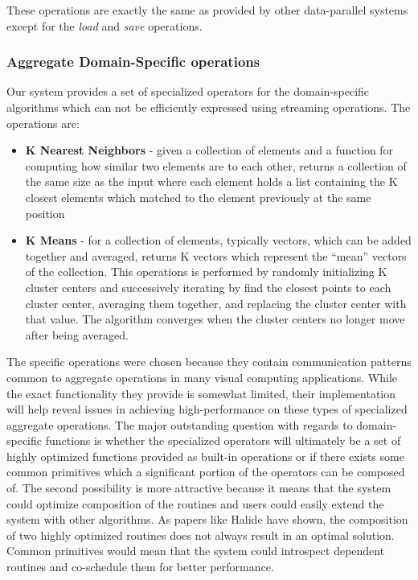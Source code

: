 \documentclass[tog]{acmsiggraph}
\begin{document}
These operations are exactly the same as provided by other data-parallel
systems except for the \textit{load} and \textit{save} operations.

\subsubsection{Aggregate Domain-Specific operations}
Our system provides a set of specialized operators for the domain-specific
algorithms which can not be efficiently expressed using streaming
operations. The operations are:

\begin{itemize}
\item \textbf{K Nearest Neighbors} - given a collection of elements and a
  function for computing how similar two elements are to each other, returns a
  collection of the same size as the input where each element holds a list
  containing the K closest elements which matched to the element previously at
  the same position
\item \textbf{K Means} - for a collection of elements, typically vectors, which
  can be added together and averaged, returns K vectors which represent the
  ``mean'' vectors of the collection. This operations is performed by randomly
  initializing K cluster centers and successively iterating by find the closest
  points to each cluster center, averaging them together, and replacing the
  cluster center with that value. The algorithm converges when the cluster
  centers no longer move after being averaged.
\end{itemize}

The specific operations were chosen because they contain communication patterns
common to aggregate operations in many visual computing applications. While the
exact functionality they provide is somewhat limited, their implementation will
help reveal issues in achieving high-performance on these types of specialized
aggregate operations. The major outstanding question with regards to
domain-specific functions is whether the specialized operators will ultimately
be a set of highly optimized functions provided as built-in operations or if
there exists some common primitives which a significant portion of the
operators can be composed of. The second possibility is more attractive because
it means that the system could optimize composition of the routines and users
could easily extend the system with other algorithms. As papers like Halide
have shown, the composition of two highly optimized routines does not always
result in an optimal solution. Common primitives would mean that the system
could introspect dependent routines and co-schedule them for better
performance.
\end{document}
